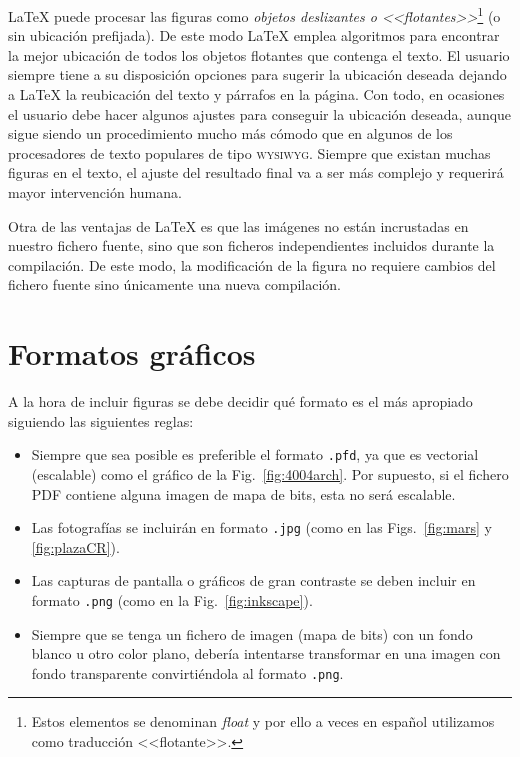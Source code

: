 \documentclass[ 		%
	11pt,				%
	a4paper,			%
	twoside,			%
	openright,			%
	final       		%
]{book}
\begin{document}
\LaTeX{} puede procesar las figuras como \emph{objetos deslizantes o <<flotantes>>}\footnote{Estos elementos se denominan \textit{float} y por ello a veces en español utilizamos como traducción <<flotante>>.} (o sin ubicación prefijada). De este modo \LaTeX{} emplea algoritmos para encontrar la mejor ubicación de todos los objetos flotantes que contenga el texto. El usuario siempre tiene a su disposición opciones para sugerir la ubicación deseada dejando a \LaTeX{} la reubicación del texto y párrafos en la página. Con todo, en ocasiones el usuario debe hacer algunos ajustes para conseguir la ubicación deseada, aunque sigue siendo un procedimiento mucho más cómodo que en algunos de los procesadores de texto populares de tipo \textsc{wysiwyg}. Siempre que existan muchas figuras en el texto, el ajuste del resultado final va a ser más complejo y requerirá mayor intervención humana.

Otra de las ventajas de \LaTeX{} es que las imágenes no están incrustadas en nuestro fichero fuente, sino que son ficheros independientes incluidos durante la compilación. De este modo, la modificación de la figura no requiere cambios del fichero fuente sino únicamente una nueva compilación.








\section{Formatos gráficos}
A la hora de incluir figuras se debe decidir qué formato es el más apropiado siguiendo las siguientes reglas:
\begin{itemize}
	\item Siempre que sea posible es preferible el formato \texttt{.pfd}, ya que es vectorial (escalable) como el gráfico de la Fig.~\ref{fig:4004arch}. Por supuesto, si el fichero \textsf{PDF} contiene alguna imagen de mapa de bits, esta no será escalable.
	\item Las fotografías se incluirán en formato \texttt{.jpg} (como en las  Figs.~\ref{fig:mars} y \ref{fig:plazaCR}).
	\item Las capturas de pantalla o gráficos de gran contraste se deben incluir en formato \texttt{.png} (como en la Fig.~\ref{fig:inkscape}). 
	\item Siempre que se tenga un fichero de imagen (mapa de bits) con un fondo blanco u otro color plano, debería intentarse transformar en una imagen con fondo transparente convirtiéndola al formato \texttt{.png}.
\end{itemize}
\end{document}
